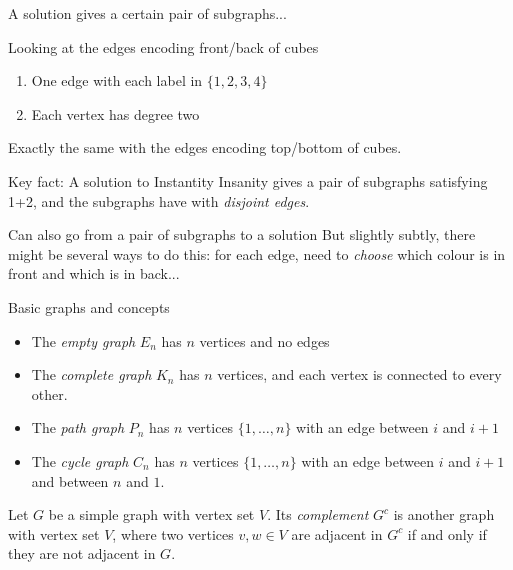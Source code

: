\documentclass{beamer}
\begin{document}
\begin{frame}{A solution gives a certain pair of subgraphs...}
  \begin{block}{Looking at the edges encoding front/back of cubes}
    \begin{enumerate}
    \item One edge with each label in $\{1,2,3,4\}$
    \item Each vertex has degree two
    \end{enumerate}
  \end{block}
 Exactly the same with the edges encoding top/bottom of cubes.

 \begin{block}{Key fact:}
   A solution to Instantity Insanity gives a pair of subgraphs satisfying 1+2, and the subgraphs have with \emph{disjoint edges}.
  \end{block}

 \begin{block}{Can also go from a pair of subgraphs to a solution}
But slightly subtly, there might be several ways to do this: for each edge, need to \emph{choose} which colour is in front and which is in back...
 \end{block}
 
\end{frame}


\begin{frame}{Basic graphs and concepts}
  \begin{itemize}
  \item The \emph{empty graph} $E_n$ has $n$ vertices and no edges
  \item The \emph{complete graph} $K_n$ has $n$ vertices, and each vertex is connected to every other.
  \item The \emph{path graph} $P_n$ has $n$ vertices $\{1,\dots,n\}$ with an edge between $i$ and $i+1$
    \item The \emph{cycle graph} $C_n$ has $n$ vertices $\{1,\dots, n\}$ with an edge between $i$ and $i+1$ and between $n$ and $1$.

  \end{itemize}

\begin{definition}Let $G$ be a simple graph with vertex set $V$.  Its \emph{complement} $G^c$ is another graph with vertex set $V$, where two vertices $v,w\in V$ are adjacent in $G^c$ if and only if they are not adjacent in $G$. \end{definition}
  
\end{frame}
\end{document}
